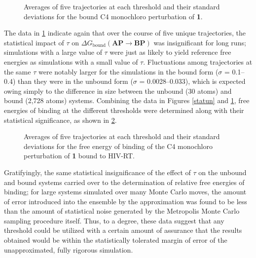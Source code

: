 \documentclass[12pt]{report}
\begin{document}
\begin{figure}[htbp]
\centering

\caption{Averages of five trajectories at each threshold and their standard deviations for the bound C4 monochloro perturbation of \textbf{1}.}
\label{statb}
\end{figure}

The data in \cref{statb} indicate again that over the course of five unique trajectories, the statistical impact of $\tau$ on 
$\Delta G_{\textrm{bound}}(\textbf{AP} \longrightarrow \textbf{BP})$ was insignificant for long runs; simulations with a large value of $\tau$ were just as likely to yield reference free energies as simulations with a small value of $\tau$. Fluctuations among trajectories at the same $\tau$ were notably larger for the simulations in the bound form ($\sigma$ = 0.1--0.4) than they were in the unbound form ($\sigma$ = 0.0028--0.033), which is expected owing simply to the difference in size between the unbound (30 atoms) and bound (2,728 atoms) systems. Combining the data in Figures \ref{statun} and \ref{statb}, free energies of binding at the different thresholds were determined along with their statistical significance, as shown in \cref{statbind}.

\begin{figure}[htbp]
\centering

\caption{Averages of five trajectories at each threshold and their standard deviations for the free energy of binding of the C4 monochloro perturbation of \textbf{1} bound to HIV-RT.}
\label{statbind}
\end{figure}

Gratifyingly, the same statistical insignificance of the effect of $\tau$ on the unbound and bound systems carried over to the determination of relative free energies of binding; for large systems simulated over many Monte Carlo moves, the amount of error introduced into the ensemble by the approximation was found to be less than the amount of statistical noise generated by the Metropolis Monte Carlo sampling procedure itself. Thus, to a degree, these data suggest that any threshold could be utilized with a certain amount of assurance that the results obtained would be within the statistically tolerated margin of error of the unapproximated, fully rigorous simulation.

\end{document}
